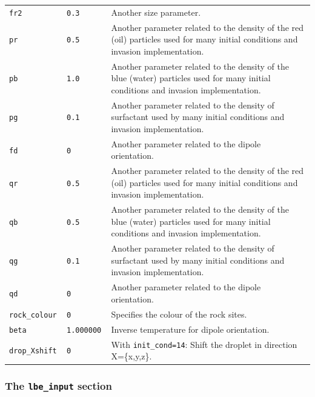 \documentclass[a4paper]{article}
\begin{document}
\begin{center}
\begin{longtable}{|l|l|p{}|}
{\tt fr2  }	&	{\tt 0.3 }	& Another size parameter.\\
{\tt pr  }	&	{\tt 0.5 }	& Another parameter related to the density of the
red (oil) particles used for many initial conditions and invasion implementation. \\
{\tt pb  }	&	{\tt 1.0 }	& Another parameter related to the density of the
blue (water) particles used for many initial conditions and invasion implementation. \\
{\tt pg  }	&	{\tt 0.1 }	& Another parameter related to the density of surfactant
 used by many initial conditions and invasion implementation. \\
{\tt fd  }	&	{\tt 0 }	& Another parameter related to the dipole orientation.\\
{\tt qr  }	&	{\tt 0.5 }	& Another parameter related to the density of the
red (oil) particles used for many initial conditions and invasion implementation. \\
{\tt qb  }	&	{\tt 0.5 }	& Another parameter related to the density of the
blue (water) particles used for many initial conditions and invasion implementation. \\
{\tt qg  }	&	{\tt 0.1 }	& Another parameter related to the density of surfactant
 used by many initial conditions and invasion implementation. \\
{\tt qd  }	&	{\tt 0 }	& Another parameter related to the dipole orientation.\\
{\tt rock\_colour  }	&	{\tt 0 }	&
		Specifies the colour of the rock sites. \\
{\tt beta  }	&	{\tt 1.000000 }	& Inverse temperature for dipole orientation.\\
{\tt drop\_Xshift } &      {\tt 0}         &
                With {\tt init\_cond=14}: Shift the droplet in direction X=\{x,y,z\}.\\

\hline
\end{longtable}
\end{center}

\subsubsection{The {\tt lbe\_input} section}
\end{document}
